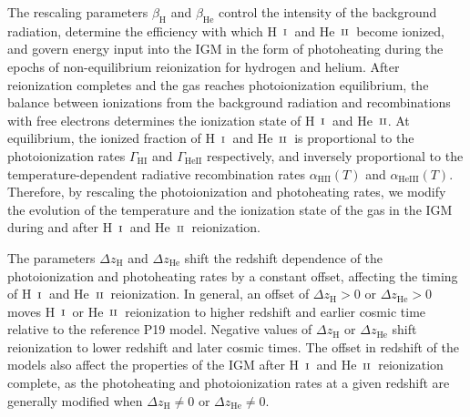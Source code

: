 \documentclass[twocolumn]{aastex62}
\def\HI{\hbox{\rm H~$\scriptstyle\rm I$}}
\def\HeII{\hbox{He~$\scriptstyle\rm II$}}
\begin{document}
The rescaling parameters $\beta_{\mathrm{H}}$ and  $\beta_{\mathrm{He}}$ control the intensity of the background radiation, determine the efficiency 
with which \HI\ and \HeII\ become ionized, and govern energy input into the IGM in the form of photoheating during the epochs of non-equilibrium reionization for hydrogen and helium. After reionization completes and the gas 
reaches photoionization equilibrium, 
the balance between ionizations from the background radiation 
and 
recombinations with free electrons
determines the ionization state of \HI\ and \HeII.
At equilibrium, the ionized fraction of \HI\ and \HeII\ is proportional to the photoionization rates $\Gamma_{\mathrm{HI}}$ and 
$\Gamma_{\mathrm{HeII}}$ respectively, and inversely proportional to the temperature-dependent radiative recombination rates $\alpha_{\mathrm{HII}}(T)$ and 
$\alpha_{\mathrm{HeIII}}(T)$. Therefore, by rescaling the photoionization and photoheating rates, we modify the evolution of the temperature and the ionization state of the 
gas in the IGM during and after \HI\ and \HeII\ reionization.            

The parameters $\Delta z_{\mathrm{H}}$ and $\Delta z_{\mathrm{He}}$ shift the redshift dependence of the photoionization and photoheating rates by a constant offset, affecting
the timing of \HI\ and \HeII\ reionization. In general, an offset of $\Delta z_{\mathrm{H}} > 0$ or $\Delta z_{\mathrm{He}} > 0$  moves \HI\ or \HeII\ reionization to higher redshift
and earlier cosmic time relative to
the reference P19 model.
Negative values of $\Delta z_{\mathrm{H}}$ or 
$\Delta z_{\mathrm{He}}$ shift reionization to lower redshift and later cosmic times.
The offset in redshift of the models also 
affect the properties of the IGM after \HI\ and \HeII\ reionization 
complete,
as the photoheating and
photoionization rates at a given redshift are generally modified 
when 
$\Delta z_{\mathrm{H}}\ne0$ or 
$\Delta z_{\mathrm{He}}\ne0$.
\end{document}
